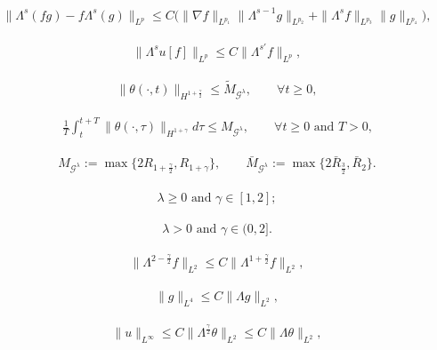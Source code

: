 \documentclass[10pt,a4paper]{amsart}
\newcommand{\Gg}{\mathcal{G}^{\lambda}}
\begin{document}
\begin{align}\label{commutator estimate}
\|\Lambda^s(fg)-f\Lambda^s(g)\|_{L^p}\le C\Big(\|\nabla f\|_{L^{p_1}}\|\Lambda^{s-1} g\|_{L^{p_2}}+\|\Lambda^s f\|_{L^{p_3}}\|g\|_{L^{p_4}}\Big),
\end{align}

\begin{align}\label{two order smoothing for u when nu>0}
\|\Lambda^s u[f]\|_{L^p}\le C\|\Lambda^{s'}f\|_{L^p},
\end{align}

\begin{align}\label{uniform bound on theta from the attractor} 
\|\theta(\cdot,t)\|_{H^{1+\frac{\gamma}{2}}}\le \tilde{M}_{\Gg},\qquad\forall t\ge0,
\end{align}

\begin{align}\label{uniform bound on time integral of theta from the attractor}
\frac{1}{T}\int_t^{t+T}\|\theta(\cdot,\tau)\|_{H^{1+\gamma}}d\tau\le M_{\Gg},\qquad \mbox{$\forall t\ge0$ and $T>0$,}
\end{align}

\begin{align}\label{def of constant M on global attractor}
M_{\Gg}:=\max\{2R_{1+\frac{\gamma}{2}},R_{1+\gamma}\},\qquad\bar{M}_{\Gg}:=\max\{2\bar{R}_{\frac{3}{2}},\bar{R}_{2}\}.
\end{align}

\begin{align}\label{conditions on gamma}
\mbox{$\lambda\ge0$ and $\gamma\in[1,2]$};
\end{align}

\begin{align}\label{conditions on gamma lambda>0}
\mbox{$\lambda>0$ and $\gamma\in(0,2]$}.
\end{align}

\begin{align}\label{bound on Lambda theta for gamma>1}
\|\Lambda^{2-\frac{\gamma}{2}}f\|_{L^2}\le C\|\Lambda^{1+\frac{\gamma}{2}}f\|_{L^2},
\end{align}

\begin{align}\label{bound on L4 using H1}
\|g\|_{L^4}\le C\|\Lambda g\|_{L^2},
\end{align}

\begin{align}\label{bound on u in terms of nabla theta}
\|u\|_{L^\infty}\le C\|\Lambda^\frac{\gamma}{2}\theta\|_{L^2}\le C\|\Lambda\theta\|_{L^2},
\end{align}
\end{document}
